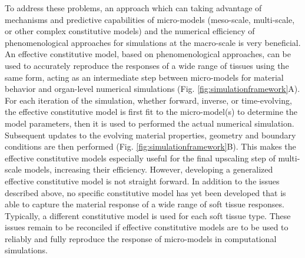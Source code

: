     To address these problems, an approach which can taking advantage of mechanisms and predictive capabilities of micro-models (meso-scale, multi-scale, or other complex constitutive models) and the numerical efficiency of phenomenological approaches for simulations at the macro-scale is very beneficial. An effective constitutive model, based on phenomenological approaches, can be used to accurately reproduce the responses of a wide range of tissues using the same form, acting as an intermediate step between micro-models for material behavior and organ-level numerical simulations (Fig. \ref{fig:simulationframework}A). For each iteration of the simulation, whether forward, inverse, or time-evolving, the effective constitutive model is first fit to the micro-model(s) to determine the model parameters, then it is used to performed the actual numerical simulation. Subsequent updates to the evolving material properties, geometry and boundary conditions are then performed (Fig. \ref{fig:simulationframework}B). This makes the effective constitutive models especially useful for the final upscaling step of multi-scale models, increasing their efficiency. However, developing a generalized effective constitutive model is not straight forward. In addition to the issues described above, no specific constitutive model has yet been developed that is able to capture the material response of a wide range of soft tissue responses. Typically, a different constitutive model is used for each soft tissue type. These issues remain to be reconciled if effective constitutive models are to be used to reliably and fully reproduce the response of micro-models in computational simulations. 
    
